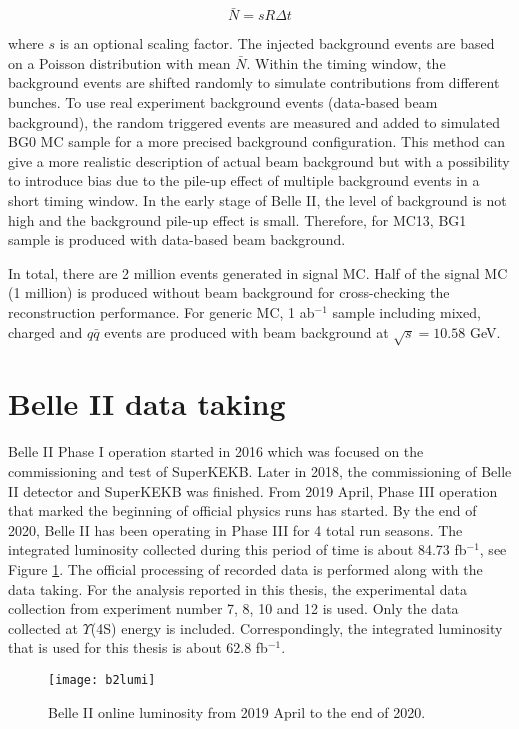 \begin{equation}\label{bkgn}
	\bar{N} = sR\Delta t
\end{equation}

where $s$ is an optional scaling factor. The injected background events are based on a Poisson distribution with mean $\bar{N}$. Within the timing window, the background events are shifted randomly to simulate contributions from different bunches. To use real experiment background events (data-based beam background), the random triggered events are measured and added to
simulated BG0 MC sample for a more precised background configuration. This method can give a more realistic description of actual beam background but with a possibility to introduce bias due to the pile-up effect of multiple background events in a short timing window. In the early stage of Belle II, the level of background is not high and the background pile-up effect is small. Therefore, for MC13, BG1 sample is produced with data-based beam background.

In total, there are 2 million events generated in signal MC. Half of the signal MC (1 million) is produced without beam background for cross-checking the reconstruction performance. For generic MC, 1 ab$^{-1}$ sample including mixed, charged and $q\bar{q}$ events are produced with beam background at  $\sqrt{s} = 10.58 $ GeV.

\section{Belle II data taking}
Belle II Phase I operation started in 2016 which was focused on the commissioning and test of SuperKEKB. Later in 2018, the commissioning of Belle II detector and SuperKEKB was finished. From 2019 April, Phase III operation that marked the beginning of official physics runs has started. By the end of 2020, Belle II has been operating in Phase III for 4 total run seasons. The integrated luminosity collected during this period of time is about 84.73 fb$^{-1}$, see Figure \ref{fig:b2lumi}. The official processing of recorded data is performed along with the data taking. For the analysis reported in this thesis, the experimental data collection from experiment number 7, 8, 10 and 12 is used.  Only the data collected at  $\Upsilon$(4S) energy is included. Correspondingly, the integrated luminosity that is used for this thesis is about 62.8 fb$^{-1}$. 

\begin{figure}
	\centering
	\texttt{[image: b2lumi]}
	\caption{Belle II online luminosity from 2019 April to the end of 2020\cite{b2onlinelumi}.}
	\label{fig:b2lumi} 
\end{figure}
